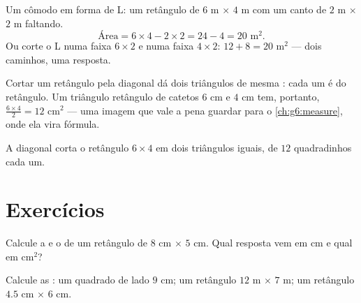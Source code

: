 \begin{example}\label{ex:g5:areas:composite}
Um cômodo em forma de L: um retângulo de $6$ m $\times$ $4$ m com um
canto de $2$ m $\times$ $2$ m faltando.
\[
\text{Área} = 6 \times 4 - 2 \times 2 = 24 - 4 = 20 \text{ m}^2 .
\]
Ou corte o L numa faixa $6 \times 2$ e numa faixa $4 \times 2$:
$12 + 8 = 20$ m$^2$ --- dois caminhos, uma resposta.
\end{example}

\begin{example}\label{ex:g5:areas:halfrect}
Cortar um retângulo pela diagonal dá dois triângulos de mesma :
cada um é \emph{} do retângulo. Um triângulo retângulo de
catetos $6$ cm e $4$ cm tem, portanto, 
$\frac{6 \times 4}{2} = 12$ cm$^2$ --- uma imagem que vale a pena
guardar para o \cref{ch:g6:measure}, onde ela vira fórmula.
\end{example}

\begin{omfigure}

{\small A diagonal corta o retângulo $6 \times 4$ em dois triângulos
iguais, de $12$ quadradinhos cada um.}
\end{omfigure}

\section{Exercícios}

\begin{exercise}[$\star$]\label{exo:g5:areas:1}
Calcule a  e o  de um retângulo de $8$ cm $\times$
$5$ cm. Qual resposta vem em cm e qual em cm$^2$?
\end{exercise}

\begin{exercise}[$\star$]\label{exo:g5:areas:2}
Calcule as : um quadrado de lado $9$ cm; um retângulo
$12$ m $\times$ $7$ m; um retângulo $4.5$ cm $\times$ $6$ cm.
\end{exercise}

